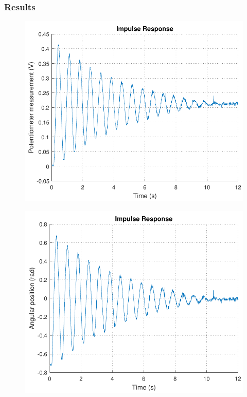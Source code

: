 \subsubsection{Results}
\begin{minipage}{\linewidth}
	\begin{minipage}{0.45\linewidth}
		\begin{figure}[H]
			\includegraphics[scale=.53]{figures/ImpVolt}
			\centering
			\vspace{-.4cm}
			\captionsetup{justification=centering}
			\label{ImpVolt}
		\end{figure}\vspace{-5mm}
	\end{minipage}
	\hspace{0.03\linewidth}
	\begin{minipage}{0.45\linewidth}
		\begin{figure}[H]
			\includegraphics[scale=.53]{figures/ImpRad}

\end{figure}
\end{minipage}
\end{minipage}
